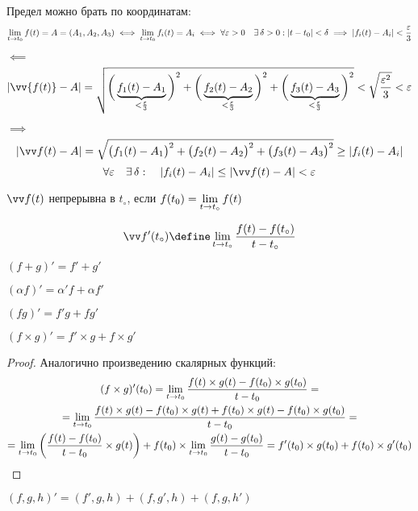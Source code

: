\begin{statement}
	Предел можно брать по координатам:
    $$ \lim\limits_{t \to t_0} f(t) = A = (A_1, A_2, A_3) \iff \lim\limits_{t \to t_0} f_i(t) = A_i \iff \forall \varepsilon > 0 \quad \exists\, \delta > 0 : |t - t_0| < \delta \implies |f_i(t) - A_i| < \frac{\varepsilon}3 $$
\end{statement}

\begin{iproof}
	\item $ \impliedby $
	$$ |\vv{f(t)} - A| = \sqrt{\bigg( \underbrace{f_1(t) - A_1}_{< \frac\veps3} \bigg)^2 + \bigg(\underbrace{f_2(t) - A_2}_{< \frac\veps3} \bigg)^2 + \bigg( \underbrace{f_3(t) - A_3}_{< \frac\veps3} \bigg)^2} < \sqrt{\frac{\veps^2}3} < \veps $$
	\item $ \implies $
    $$ |\vv f(t) - A| = \sqrt{\big( f_1(t) - A_1 \big)^2 + \big( f_2(t) - A_2 \big)^2 + \big( f_3(t) - A_3 \big)^2 } \ge |f_i(t) - A_i| $$
    $$ \forall \veps \quad \exist \delta : \quad |f_i(t) - A_i| \le |\vv f(t) - A| < \veps $$
\end{iproof}

\begin{definition}
    $ \vv f(t) $ непрерывна в $ t_\circ $, если $ f(t_0) = \lim\limits_{t \to t_\circ}f(t) $
\end{definition}

\begin{definition}
    $$ \vv f'(t_\circ) \define \liml{t \to t_\circ} \frac{f(t) - f(t_\circ)}{t - t_\circ} $$
\end{definition}

\begin{stmts}
	\item $ (f + g)' = f' + g' $
    \item $ (\alpha f)' = \alpha' f + \alpha f' $
    \item $ (fg)' = f'g + fg' $
    \item $ (f \times g)' = f' \times g + f \times g' $
    \begin{proof}
        Аналогично произведению скалярных функций:
        \begin{multline*}
        	(f \times g)'(t_0) = \lim\limits_{t \to t_0} \frac{f(t) \times g(t) - f(t_0) \times g(t_0)}{t - t_0} = \\
			= \lim\limits_{t \to t_0} \frac{f(t) \times g(t) - f(t_0) \times g(t) + f(t_0) \times g(t) - f(t_0) \times g(t_0)}{t - t_0} = \\
			= \lim\limits_{t \to t_0} \bigg( \frac{f(t) - f(t_0)}{t - t_0} \times g(t) \bigg) + f(t_0) \times \lim\limits_{t \to t_0} \frac{g(t) - g(t_0)}{t - t_0} = f'(t_0) \times g(t_0) + f(t_0) \times g'(t_0)
        \end{multline*}
    \end{proof}
    \item $ (f, g, h)' = (f', g, h) + (f, g', h) + (f, g, h') $
\end{stmts}

